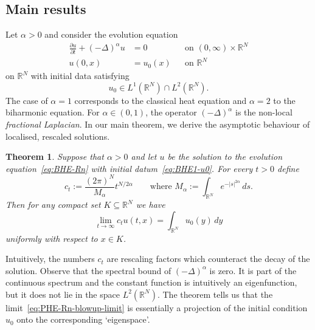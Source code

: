 \documentclass[a4paper, reqno,titlepage]{amsart}
\numberwithin{equation}{section}
\theoremstyle{plain}
\newtheorem{theorem}{Theorem}[section]
\theoremstyle{definition}
\theoremstyle{remark}
\newcommand{\RR}{\mathbb{R}}
\begin{document}
\subsection{Main results}
Let $\alpha > 0$ and consider the evolution equation
\begin{equation}
  \label{eq:BHE-Rn}
  \begin{aligned}
    \frac{\partial u}{\partial t} + (-\Delta)^{\alpha} u & = 0
                                                         &          & \text{on } (0, \infty) \times \RR^N \\
    u(0, x)                                              & = u_0(x)
                                                         &          & \text{on } \RR^N
  \end{aligned}
\end{equation}
on $\RR^N$ with initial data satisfying
\begin{equation}
  \label{eq:BHE1-u0}
  u_0 \in L^1(\RR^N) \cap L^2(\RR^N).
\end{equation}
The case of $\alpha=1$ corresponds to the classical heat equation and $\alpha=2$ to the biharmonic equation. For $\alpha \in (0, 1)$, the operator $(-\Delta)^\alpha$ is the non-local \emph{fractional Laplacian}. In our main theorem, we derive the asymptotic behaviour of localised, rescaled solutions.

\begin{theorem}
  \label{thm:BHE-Rn}
  Suppose that $\alpha > 0$ and let $u$ be the solution to the evolution equation~\eqref{eq:BHE-Rn} with initial datum~\eqref{eq:BHE1-u0}. For every $t > 0$ define
  \begin{equation}
    \label{eq:PHE-Rn-ct}
    c_t := \frac{(2\pi)^N}{M_\alpha}t^{N/2\alpha} \qquad \text{where } M_\alpha:= \int_{\RR^N} e^{-|s|^{2\alpha}} \,ds.
  \end{equation}
  Then for any compact set $K \subseteq \RR^N$ we have
  \begin{equation}
    \label{eq:PHE-Rn-blowup-limit}
    \lim_{t\to\infty}c_t u(t,x)
    =\int_{\RR^N} u_0(y)\,dy
  \end{equation}
  uniformly with respect to $x\in K$.
\end{theorem}

Intuitively, the numbers $c_t$ are rescaling factors which counteract the decay of the solution. Observe that the spectral bound of $(-\Delta)^{\alpha}$ is zero. It is part of the continuous spectrum and the constant function is intuitively an eigenfunction, but it does not lie in the space $L^2(\RR^N)$. The theorem tells us that the limit~\eqref{eq:PHE-Rn-blowup-limit} is essentially a projection of the initial condition $u_0$ onto the corresponding `eigenspace'.
\end{document}
